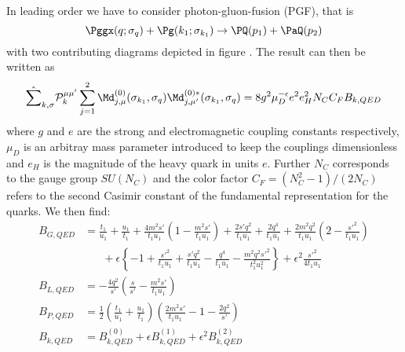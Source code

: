 In leading order we have to consider photon-gluon-fusion (PGF), that is
\begin{equation}
\Pggx(q;\sigma_q) + \Pg(k_1;\sigma_{k_1}) \rightarrow \PQ(p_1)+\PaQ(p_2)
\end{equation}
with two contributing diagrams depicted in figure . The result can then be written as
\begin{equation}
\hat\sum_{k,\sigma}\mathcal P_{k}^{\mu\mu'}\sum_{j=1}^2\Md^{(0)}_{j,\mu}(\sigma_{k_1},\sigma_q)\Md^{(0)*}_{j,\mu'}(\sigma_{k_1},\sigma_q) = 8g^2\mu_D^{-\epsilon}e^2e_H^2 N_C C_F B_{k,QED}
\end{equation}
where $g$ and $e$ are the strong and electromagnetic coupling constants respectively, $\mu_D$ is an arbitray mass parameter introduced to keep the couplings dimensionless and $e_H$ is the magnitude of the heavy quark in units $e$. Further $N_C$ corresponds to the gauge group $SU(N_C)$ and the color factor $C_F=(N_C^2-1)/(2N_C)$ refers to the second Casimir constant of the fundamental representation for the quarks. We then find:
\begin{align}
B_{G,QED} &= \frac{t_1}{u_1} + \frac{u_1}{t_1} + \frac{4m^2s'}{t_1u_1}\left(1-\frac{m^2s'}{t_1u_1}\right)
+\frac{2s'q^2}{t_1u_1} +\frac{2q^4}{t_1u_1} + \frac{2m^2q^2}{t_1u_1}\left(2-\frac{{s'}^2}{t_1u_1}\right)\nonumber\\
 &\hspace{20pt}+\epsilon\left\{ -1 + \frac{{s'}^2}{t_1u_1} + \frac{s'q^2}{t_1u_1} -
\frac{q^4}{t_1u_1} - \frac{m^2q^2{s'}^2}{t_1^2u_1^2} \right\} + \epsilon^2\frac{{s'}^2}{4t_1u_1}\\
B_{L,QED} &= -\frac{4q^2}{s'}\left(\frac s {s'} - \frac{m^2s'}{t_1u_1}\right)\\
B_{P,QED} &= \frac 1 2\left(\frac{t_1}{u_1}+\frac{u_1}{t_1}\right)\left(\frac{2m^2 s'}{t_1u_1}-1 - \frac{2q^2}{s'}\right)\\
B_{k,QED} &= B^{(0)}_{k,QED} + \epsilon B^{(1)}_{k,QED} + \epsilon^2 B^{(2)}_{k,QED}
\end{align}

